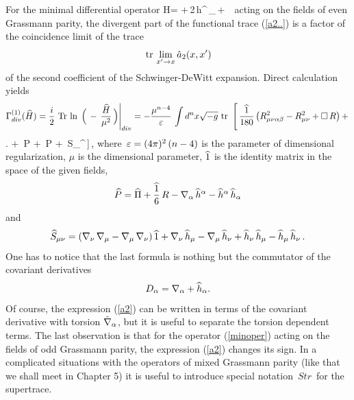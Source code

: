 For the minimal differential operator 
\beq
{\wh H}={}\,{\Box}\,+\,2\,{\wh h}^\la\,\na_\la\,+\,
{\wh \Pi}\,
\label{minoper}
\eeq 
acting on the fields of even Grassmann parity, 
the divergent part of the functional trace (\ref{a2..})
is a factor of the coincidence limit of the trace 
$$
\,\mbox{tr}\, \lim_{x^\prime \to x}{\hat a}_2(x,x^\prime) 
$$
of the second coefficient of the Schwinger-DeWitt 
expansion. Direct calculation yields \cite{dewitt}
$$
\Gamma^{(1)}_{div}({\widehat H})
= \frac{i}{2}\,\,\mbox{Tr}\,\ln\,\left.\Big(\,-\,\frac{{\widehat H}}{\mu^2}\,
\Big)\right|_{div} 
= - \frac{\mu^{n-4}}{\varepsilon}\,\int d^nx\sqrt{-g}\,\,\mbox{tr}\,\,\left[\,
\frac{\widehat 1}{180}\left(R_{\mu\nu\alpha\beta}^2 - R_{\mu\nu}^2
+ {\Box}\,R\right) + 
\right.
$$
\beq 
\left.
+ \,{\Box}{\wh P} 
+ \,{\wh P} 
+ \,{\wh S}_{\mu\nu}^{\mu\nu}\,\right]\,,
\label{a2}
\eeq
where $\,\varepsilon = (4\pi)^2\,(n-4)$ is the parameter of 
dimensional regularization, $\mu$ is the dimensional parameter, 
${\widehat 1}$ is the identity matrix in the space of the given fields,
$$
{\widehat P} = {\widehat \Pi} + \frac{\widehat 1}{6}\,R - \nabla_\alpha\,{\widehat h}^\alpha
- {\widehat h}^\alpha\,{\widehat h}_\alpha
$$
and
$$
{\widehat S}_{\mu\nu} = 
(\nabla_\nu\,\nabla_\mu - \nabla_\mu\,\nabla_\nu)\,{\widehat 1} +
\nabla_\nu\,{\widehat h}_\mu - \nabla_\mu\,{\widehat h}_\nu + 
{\widehat h}_\nu\,{\widehat h}_\mu - {\widehat h}_\mu\,{\widehat h}_\nu\,.
$$
One has to notice that the last formula is nothing but 
the commutator of the covariant derivatives 
$$
D_\alpha = \nabla_\alpha + {\widehat h_\alpha}. 
$$
Of course, the expression (\ref{a2}) can be written 
in terms of the covariant derivative with torsion
${\tilde {\nabla}}_\alpha$, but it is useful to separate 
the torsion dependent terms. The last observation is that  
for the operator (\ref{minoper}) acting on the fields
of odd Grassmann parity, the expression (\ref{a2})
changes its sign. In a complicated situations with the 
operators of mixed Grassmann parity (like that 
we shall meet in Chapter 5) it is useful 
to introduce special notation $\,Str\,$ for the supertrace.  

